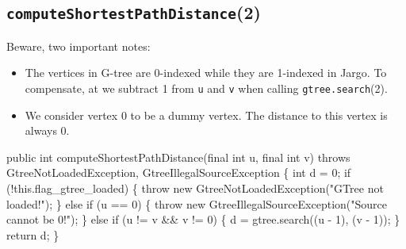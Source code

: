 \subsection{{\tt{}\protect{}computeShortestPathDistance}(2)}
Beware, two important notes:
\begin{itemize}
\item The vertices in G-tree are 0-indexed while they are 1-indexed in Jargo.
To compensate, at we subtract 1 from {\tt{}u} and {\tt{}v} when calling
{\tt{}\protect{}gtree.search}(2).
\item We consider vertex 0 to be a dummy vertex. The distance to this vertex
is always 0.
\end{itemize}
\nwenddocs{}\endmoddef{}
public int computeShortestPathDistance(final int u, final int v)
throws GtreeNotLoadedException, GtreeIllegalSourceException \{
  int d = 0;
  if (!this.flag_gtree_loaded) \{
    throw new GtreeNotLoadedException("GTree not loaded!");
  \} else if (u == 0) \{
    throw new GtreeIllegalSourceException("Source cannot be 0!");
  \} else if (u != v && v != 0) \{
    d = gtree.search((u - 1), (v - 1));
  \}
  return d;
\}
\eatline
{}\nwendcode{}\nwdocspar
